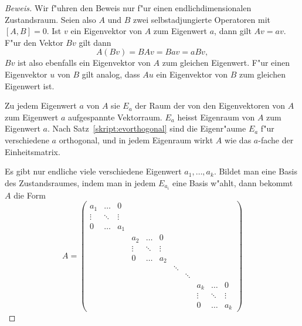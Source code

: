 \begin{proof}[Beweis]
Wir f"uhren den Beweis nur f"ur einen endlichdimensionalen Zustandsraum.
Seien also $A$ und $B$ zwei selbstadjungierte Operatoren mit $[A,B]=0$.
Ist $v$ ein Eigenvektor von $A$ zum Eigenwert $a$, dann gilt
$ Av=av $.
F"ur den Vektor $Bv$ gilt dann
\[
A(Bv)=BAv=Bav=aBv,
\]
$Bv$ ist also ebenfalls ein Eigenvektor von $A$ zum gleichen Eigenwert.
F"ur einen Eigenvektor $u$ von $B$ gilt analog, dass $Au$ ein Eigenvektor
von $B$ zum gleichen Eigenwert ist.

Zu jedem Eigenwert $a$ von $A$ sie $E_a$ der Raum der von den 
Eigenvektoren von $A$ zum Eigenwert $a$ aufgespannte Vektorraum.
$E_a$ heisst Eigenraum von $A$ zum Eigenwert $a$.
Nach Satz~\ref{skript:evorthogonal} sind die Eigenr"aume $E_a$ 
f"ur verschiedene $a$ orthogonal, und in jedem Eigenraum wirkt $A$
wie das $a$-fache der Einheitsmatrix.

Es gibt nur endliche viele verschiedene Eigenwert $a_1,\dots,a_k$.
Bildet man eine Basis des Zustandsraumes, indem man in jedem $E_{a_i}$
eine Basis w"ahlt, dann bekommt $A$ die Form
\[
A=\left(
\begin{array}{ccccccccccc}
a_1   &\dots &0     &      &      &      &      &      &      &      &      \\
\vdots&\ddots&\vdots&      &      &      &      &      &      &      &      \\
0     &\dots &a_1   &      &      &      &      &      &      &      &      \\
      &      &      &a_2   &\dots &0     &      &      &      &      &      \\
      &      &      &\vdots&\ddots&\vdots&      &      &      &      &      \\
      &      &      &0     &\dots &a_2   &      &      &      &      &      \\
      &      &      &      &      &      &\ddots&      &      &      &      \\
      &      &      &      &      &      &      &\ddots&      &      &      \\
      &      &      &      &      &      &      &      &a_k   &\dots &0     \\
      &      &      &      &      &      &      &      &\vdots&\ddots&\vdots\\
      &      &      &      &      &      &      &      &0     &\dots &a_k   
\end{array}
\right)
\]


\end{proof}
